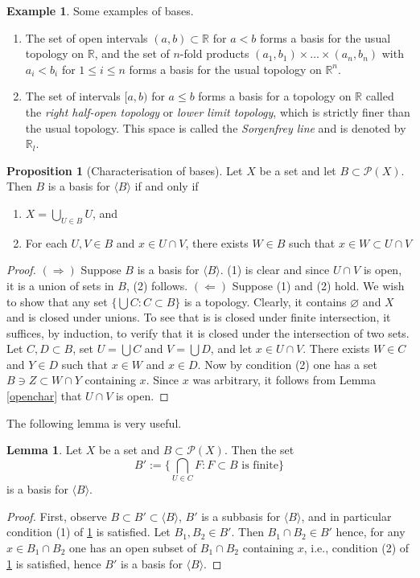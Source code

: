 \documentclass{book}
\theoremstyle{definition}
\newtheorem{proposition}{Proposition}[section]
\newtheorem{lemma}[theorem]{Lemma}
\newtheorem{example}{Example}[section]
\theoremstyle{remark}
\newcommand{\R}{\mathbb{R}}
\begin{document}
\begin{example} Some examples of bases.
\begin{enumerate}
    \item The set of open intervals $(a,b)\subset\R$ for $a<b$ forms a basis for the usual topology on $\R$, and the set of $n$-fold products $(a_1,b_1)\times\hdots\times(a_n,b_n)$ with $a_i<b_i$ for $1\leq i\leq n$ forms a basis for the usual topology on $\R^n$.
    \item \label{sorgenfreyline} The set of intervals $[a,b)$ for $a\leq b$ forms a basis for a topology on $\R$ called the \textit{right half-open topology} or \textit{lower limit topology}, which is strictly finer than the usual topology. This space is called the \textit{Sorgenfrey line} and is denoted by $\R_l$.
\end{enumerate}
\end{example}

\begin{proposition}[Characterisation of bases]
\label{basechar}
Let $X$ be a set and let $B\subset \mathcal P(X)$. Then $B$ is a basis for $\langle B\rangle$ if and only if
\begin{enumerate}
    \item $X=\bigcup_{U\in B} U$, and
    \item For each $U,V\in B$ and $x\in U\cap V$, there exists $W\in B$ such that $x\in W\subset U\cap V$
\end{enumerate}
\end{proposition}
\begin{proof}
$(\Rightarrow)$ Suppose $B$ is a basis for $\langle B\rangle$. (1) is clear and since $U\cap V$ is open, it is a union of sets in $B$, (2) follows. $(\Leftarrow)$ Suppose (1) and (2) hold. We wish to show that any set $\{\bigcup C:C\subset B\}$ is a topology. Clearly, it contains $\varnothing$ and $X$ and is closed under unions. To see that is is closed under finite intersection, it suffices, by induction, to verify that it is closed under the intersection of two sets. Let $C,D\subset B$, set $U=\bigcup C$ and $V=\bigcup D$, and let $x\in U\cap V$. There exists $W\in C$ and $Y\in D$ such that $x\in W$ and $x\in D$. Now by condition (2) one has a set $B\ni Z\subset W\cap Y$ containing $x$. Since $x$ was arbitrary, it follows from Lemma \ref{openchar} that $U\cap V$ is open.
\end{proof}

The following lemma is very useful.
\begin{lemma}
Let $X$ be a set and $B\subset\mathcal P(X)$. Then the set
$$B':=\big\{\bigcap_{U\in C} F:F\subset B\text{ is finite}\big\}$$
is a basis for $\langle B\rangle$.
\end{lemma}
\begin{proof}
First, observe $B\subset B'\subset\langle B\rangle$, $B'$ is a subbasis for $\langle B\rangle$, and in particular condition (1) of \ref{basechar} is satisfied. Let $B_1,B_2\in B'$. Then $B_1\cap B_2\in B'$ hence, for any $x\in B_1\cap B_2$ one has an open subset of $B_1\cap B_2$ containing $x$, i.e., condition (2) of \ref{basechar} is satisfied, hence $B'$ is a basis for $\langle B\rangle$.
\end{proof}
\end{document}

